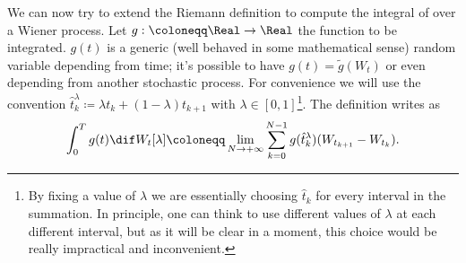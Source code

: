 We can now try to extend the Riemann definition to compute the integral of over a Wiener
process. Let \(g:\coloneqq\Real\to\Real\) the function to be integrated. \(g{(t)}\) is a generic (well behaved in some mathematical sense)
random variable depending from time; it's possible to have \(g{(t)} = \tilde{g}{(W_t)}\) or even depending from another stochastic process.
For convenience we will use the convention 
\(\hat{t}_k^\lambda \coloneqq \lambda t_k + (1-\lambda) t_{k+1}\) with \(\lambda\in[0,1]\)\footnote{
  By fixing a value of \(\lambda\) we are essentially choosing \(\hat{t}_k\) for every 
  interval in the summation. In principle, one can think to use different values of \(\lambda\)
  at each different interval, but as it will be clear in a moment, this choice would be
  really impractical and inconvenient.
}. The definition writes as 
\[
  \int_0^T g{(t)}\dif W_t{[\lambda]} \coloneqq \lim_{N\to+\infty} \sum_{k=0}^{N-1}g{(\hat{t}_k^\lambda)}(W_{t_{k+1}}-W_{t_k}).
\]

